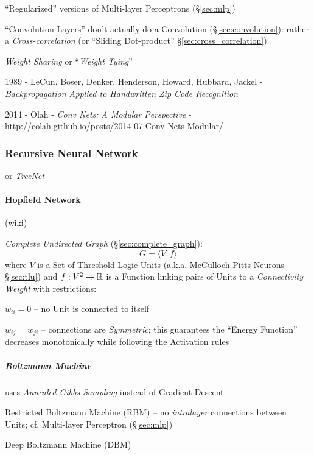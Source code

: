 ``Regularized'' versions of Multi-layer Perceptrons (\S\ref{sec:mlp})

``Convolution Layers'' don't actually do a Convolution
(\S\ref{sec:convolution}):
rather a \emph{Cross-correlation} (or ``Sliding Dot-product''
\S\ref{sec:cross_correlation})

\emph{Weight Sharing} or ``\emph{Weight Tying}''

1989 - LeCun, Boser, Denker, Henderson, Howard, Hubbard, Jackel -
  \emph{Backpropagation Applied to Handwritten Zip Code Recognition}

2014 - Olah - \emph{Conv Nets: A Modular Perspective} -
  \url{http://colah.github.io/posts/2014-07-Conv-Nets-Modular/}



\subsubsection{Recursive Neural Network}\label{sec:recursive_nn}

or \emph{TreeNet}



\paragraph{Hopfield Network}\label{sec:hopfield_network}\hfill

(wiki)

\emph{Complete Undirected Graph} (\S\ref{sec:complete_graph}):
\[
  G = \langle{V, f}\rangle
\]
where $V$ is a Set of Threshold Logic Units (a.k.a. McCulloch-Pitts Neurons
\S\ref{sec:tlu}) and $f : V^2 \rightarrow \mathbb{R}$ is a Function linking pairs of
Units to a \emph{Connectivity Weight} with restrictions:

$w_{ii} = 0$ -- no Unit is connected to itself

$w_{ij} = w_{ji}$ -- connections are \emph{Symmetric}; this guarantees the
``Energy Function'' decreases monotonically while following the Activation rules



\subparagraph{Boltzmann Machine}\label{sec:boltzmann_machine}\hfill

uses \emph{Annealed Gibbs Sampling} instead of Gradient Descent

Restricted Boltzmann Machine (RBM) -- no \emph{intralayer} connections between
Units; cf. Multi-layer Perceptron (\S\ref{sec:mlp})

Deep Boltzmann Machine (DBM)

